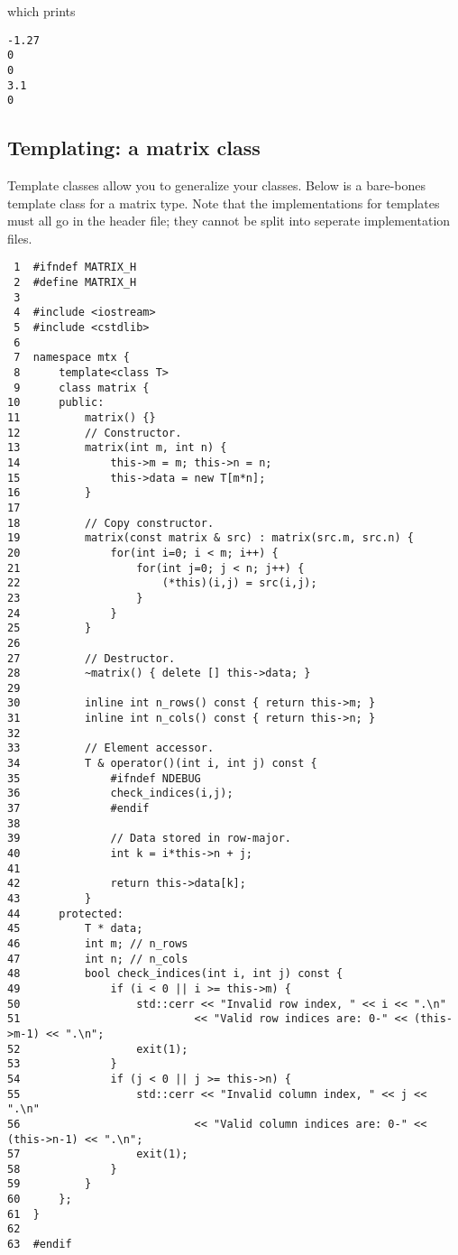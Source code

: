 \documentclass[11pt]{article}
\begin{document}
which prints

\begin{verbatim}
-1.27
0
0
3.1
0
\end{verbatim}

\subsection{Templating: a matrix class}
\label{sec:orgheadline60}

Template classes allow you to generalize your classes. Below is a bare-bones 
template class for a matrix type. Note that the implementations for templates 
must all go in the header file; they cannot be split into seperate 
implementation files.

\begin{verbatim}
 1  #ifndef MATRIX_H
 2  #define MATRIX_H
 3  
 4  #include <iostream>
 5  #include <cstdlib>
 6  
 7  namespace mtx {
 8      template<class T>
 9      class matrix {
10      public:
11          matrix() {}
12          // Constructor.
13          matrix(int m, int n) {
14              this->m = m; this->n = n;
15              this->data = new T[m*n];
16          }
17  
18          // Copy constructor.
19          matrix(const matrix & src) : matrix(src.m, src.n) {
20              for(int i=0; i < m; i++) {
21                  for(int j=0; j < n; j++) {
22                      (*this)(i,j) = src(i,j);
23                  }
24              }
25          }
26  
27          // Destructor.
28          ~matrix() { delete [] this->data; }
29  
30          inline int n_rows() const { return this->m; }
31          inline int n_cols() const { return this->n; }
32  
33          // Element accessor.
34          T & operator()(int i, int j) const {
35              #ifndef NDEBUG
36              check_indices(i,j);
37              #endif
38  
39              // Data stored in row-major.
40              int k = i*this->n + j;
41  
42              return this->data[k];
43          }
44      protected:
45          T * data;
46          int m; // n_rows
47          int n; // n_cols
48          bool check_indices(int i, int j) const {
49              if (i < 0 || i >= this->m) {
50                  std::cerr << "Invalid row index, " << i << ".\n"
51                           << "Valid row indices are: 0-" << (this->m-1) << ".\n";
52                  exit(1);
53              }
54              if (j < 0 || j >= this->n) {
55                  std::cerr << "Invalid column index, " << j << ".\n"
56                           << "Valid column indices are: 0-" << (this->n-1) << ".\n";
57                  exit(1);
58              }
59          }
60      };
61  }
62  
63  #endif
\end{verbatim}
\end{document}
